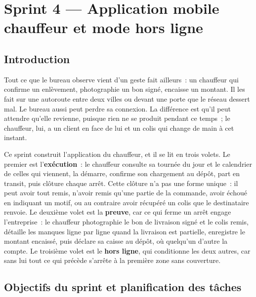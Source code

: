 %
\chapter{Sprint 4 — Application mobile chauffeur et mode hors ligne}
\label{ch:mobile}

\section{Introduction}

Tout ce que le bureau observe vient d'un geste fait ailleurs~: un chauffeur qui confirme un
enlèvement, photographie un bon signé, encaisse un montant. Il les fait sur une autoroute entre deux
villes ou devant une porte que le réseau dessert mal. Le bureau aussi peut perdre sa connexion. La
différence est qu'il peut attendre qu'elle revienne, puisque rien ne se produit pendant ce temps~; le
chauffeur, lui, a un client en face de lui et un colis qui change de main à cet instant.

Ce sprint construit l'application du chauffeur, et il se lit en trois volets. Le premier est
l'\textbf{exécution}~: le chauffeur consulte sa tournée du jour et le calendrier de celles qui
viennent, la démarre, confirme son chargement au dépôt, part en transit, puis clôture chaque arrêt.
Cette clôture n'a pas une forme unique~: il peut avoir tout remis, n'avoir remis qu'une partie de la
commande, avoir échoué en indiquant un motif, ou au contraire avoir récupéré un colis que le
destinataire renvoie. Le deuxième volet est la \textbf{preuve}, car ce qui ferme un arrêt engage
l'entreprise~: le chauffeur photographie le bon de livraison signé et le colis remis, détaille les
manques ligne par ligne quand la livraison est partielle, enregistre le montant encaissé, puis
déclare sa caisse au dépôt, où quelqu'un d'autre la compte. Le troisième volet est le
\textbf{hors ligne}, qui conditionne les deux autres, car sans lui tout ce qui précède s'arrête à la
première zone sans couverture.

\section{Objectifs du sprint et planification des tâches}

